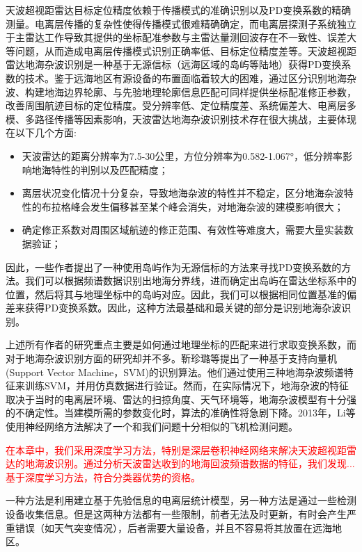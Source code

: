 天波超视距雷达目标定位精度依赖于传播模式的准确识别以及PD变换系数的精确测量。电离层传播的复杂性使得传播模式很难精确确定，而电离层探测子系统独立于主雷达工作导致其提供的坐标配准参数与主雷达量测回波存在不一致性、误差大等问题，从而造成电离层传播模式识别正确率低、目标定位精度差等。天波超视距雷达地海杂波识别是一种基于无源信标（远海区域的岛屿等陆地）获得PD变换系数的技术。鉴于远海地区有源设备的布置面临着较大的困难，通过区分识别地海杂波、构建地海边界轮廓、与先验地理轮廓信息匹配可同样提供坐标配准修正参数，改善周围航迹目标的定位精度。受分辨率低、定位精度差、系统偏差大、电离层多模、多路径传播等因素影响，天波雷达地海杂波识别技术存在很大挑战，主要体现在以下几个方面:
\begin{itemize}
	\item 天波雷达的距离分辨率为7.5-30公里，方位分辨率为0.582-1.067°，低分辨率影响地海特性的判别以及匹配精度；
	\item 离层状况变化情况十分复杂，导致地海杂波的特性并不稳定，区分地海杂波特性的布拉格峰会发生偏移甚至某个峰会消失，对地海杂波的建模影响很大；
	\item 确定修正系数对周围区域航迹的修正范围、有效性等难度大，需要大量实装数据验证；
\end{itemize}

因此，一些作者提出了一种使用岛屿作为无源信标的方法来寻找PD变换系数\cite{cuccoli2011coordinate}的方法。我们可以根据频谱数据识别出地海分界线，进而确定出岛屿在雷达坐标系中的位置，然后将其与地理坐标中的岛屿对应。因此，我们可以根据相同位置基准的偏差来获得PD变换系数。因此，这种方法最基础和最关键的部分是识别地海杂波识别。

上述所有作者的研究重点主要是如何通过地理坐标的匹配来进行求取变换系数，而对于地海杂波识别方面的研究却并不多。靳珍璐等\cite{jin2012svm}提出了一种基于支持向量机(Support Vector Machine，SVM)的识别算法。他们通过使用三种地海杂波频谱特征来训练SVM，并用仿真数据进行验证。然而，在实际情况下，地海杂波的特征取决于当时的电离层环境、雷达的扫掠角度、天气环境等，地海杂波模型有十分强的不确定性。当建模所需的参数变化时，算法的准确性将急剧下降。2013年，Li等\cite{li2013high} 使用神经网络方法解决了一个和我们问题十分相似的飞机检测问题。

\textcolor{red}{在本章中，我们采用深度学习方法，特别是深层卷积神经网络来解决天波超视距雷达的地海波识别。通过分析天波雷达收到的地海回波频谱数据的特征，我们发现...基于深度学习方法，符合分类器优势的资格。}

一种方法是利用建立基于先验信息的电离层统计模型，另一种方法是通过一些检测设备收集信息。但是这两种方法都有一些限制，前者无法及时更新，有时会产生严重错误（如天气突变情况），后者需要大量设备，并且不容易将其放置在远海地区。

